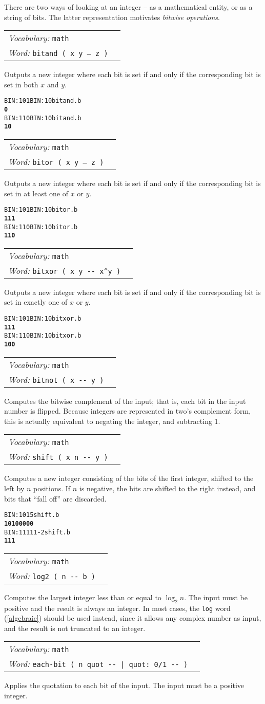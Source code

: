 \documentclass{book}
\newcommand{\vocabulary}[1]{\emph{Vocabulary:} \texttt{#1}&\\}
\newcommand{\ordinaryword}[2]{\index{\texttt{#1}}\emph{Word:} \texttt{#2}&\\}
\newcommand{\wordtable}[1]{


\begin{tabularx}{12cm}{lX}
\hline
#1
\hline
\end{tabularx}

}
\begin{document}
There are two ways of looking at an integer -- as a mathematical entity, or as a string of bits. The latter representation motivates \emph{bitwise operations}.
\wordtable{
\vocabulary{math}
\ordinaryword{bitand}{bitand ( x y -- z )}
}
Outputs a new integer where each bit is set if and only if the corresponding bit is set in both $x$ and $y$.
\begin{alltt}
  BIN: 101 BIN: 10 bitand .b
\textbf{0}
  BIN: 110 BIN: 10 bitand .b
\textbf{10}
\end{alltt}
\wordtable{
\vocabulary{math}
\ordinaryword{bitor}{bitor ( x y -- z )}
}
Outputs a new integer where each bit is set if and only if the corresponding bit is set in at least one of $x$ or $y$.
\begin{alltt}
  BIN: 101 BIN: 10 bitor .b
\textbf{111}
  BIN: 110 BIN: 10 bitor .b
\textbf{110}
\end{alltt}
\wordtable{
\vocabulary{math}
\ordinaryword{bitxor}{bitxor ( x y -{}- x\^{}y )}
}
Outputs a new integer where each bit is set if and only if the corresponding bit is set in exactly one of $x$ or $y$.
\begin{alltt}
  BIN: 101 BIN: 10 bitxor .b
\textbf{111}
  BIN: 110 BIN: 10 bitxor .b
\textbf{100}
\end{alltt}
\wordtable{
\vocabulary{math}
\ordinaryword{bitnot}{bitnot ( x -{}- y )}
}
Computes the bitwise complement of the input; that is, each bit in the input number is flipped. Because integers are represented in two's complement form, this is actually equivalent to negating the integer, and subtracting 1.
\wordtable{
\vocabulary{math}
\ordinaryword{shift}{shift ( x n -{}- y )}
}
Computes a new integer consisting of the bits of the first integer, shifted to the left by $n$ positions. If $n$ is negative, the bits are shifted to the right instead, and bits that ``fall off'' are discarded.
\begin{alltt}
  BIN: 101 5 shift .b
\textbf{10100000}
  BIN: 11111 -2 shift .b
\textbf{111}
\end{alltt}

\wordtable{
\vocabulary{math}
\ordinaryword{log2}{log2 ( n -{}- b )}
}
Computes the largest integer less than or equal to $\log_2 n$. The input must be positive and the result is always an integer. In most cases, the \verb|log| word (\ref{algebraic}) should be used instead, since it allows any complex number as input, and the result is not truncated to an integer.

\wordtable{
\vocabulary{math}
\ordinaryword{each-bit}{each-bit ( n quot -{}- | quot: 0/1 -{}- )}
}
Applies the quotation to each bit of the input. The input must be a positive integer.
\end{document}

